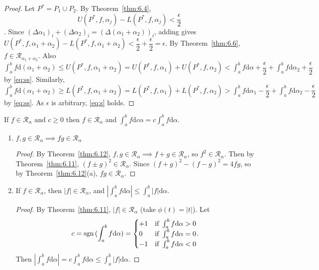 \begin{thm}[12]
\begin{enumerate}
\begin{proof}
			      Let $P^{*}=P_1 \cup P_2$. By Theorem~\ref{thm:6.4},
			      \begin{equation*}
				      U(P^{*},f,\alpha_j)-L(P^{*},f,\alpha_j)<\dfrac{\epsilon}{2} \label{eq:ss}\tag{**}
			      \end{equation*}.
			      Since $(\Delta \alpha_1)_i+(\Delta \alpha_2)_i=(\Delta(\alpha_1+\alpha_2))_i$, adding gives $U(P^{*},f,\alpha_1+\alpha_2)-L(P^{*},f,\alpha_1+\alpha_2)<\dfrac{\epsilon}{2}+\dfrac{\epsilon}{2}=\epsilon$.
			      By Theorem~\ref{thm:6.6}, $f \in \mathscr{R}_{\alpha_1+\alpha_2}$.
			      Also $\int_{a}^{b}{f\mathrm{d}(\alpha_1+\alpha_2)}\le U(P^{*},f,\alpha_1+\alpha_2)=U(P^{*},f,\alpha_1)+U(P^{*},f,\alpha_2)<\int_{a}^{b}{f\mathrm{d}\alpha}+\dfrac{\epsilon}{2}+\int_{a}^{b}{f\mathrm{d}\alpha_2}+\dfrac{\epsilon}{2}$ by \eqref{eq:ss}.
			      Similarly, $\int_{a}^{b}{f\mathrm{d}(\alpha_1+\alpha_2)}\ge L(P^{*},f,\alpha_1+\alpha_2)=L(P^{*},f,\alpha_1)+L(P^{*},f,\alpha_2)>\int_{a}^{b}{f\mathrm{d}\alpha_1}-\dfrac{\epsilon}{2}+\int_{a}^{b}{f\mathrm{d}\alpha_2}-\dfrac{\epsilon}{2}$ by \eqref{eq:ss}. As $\epsilon$ is arbitrary, \eqref{eq:s} holds.
		      \end{proof}
		      If $f \in \mathscr{R}_{\alpha} \text{ and }  c\ge 0$ then $f \in \mathscr{R}_{\alpha}$ and
		      $\int_{a}^{b}{f\mathrm{d}c \alpha}= c \int_{a}^{b}{f\mathrm{d}\alpha}$.
	\end{enumerate}
\end{thm}
\begin{thm}[13]
	\begin{enumerate}
		\item $f,g \in \mathscr{R}_{\alpha}\implies fg \in \mathscr{R}_{\alpha}$
		      \begin{proof}
			      By Theorem~\ref{thm:6.12}, $f,g \in \mathscr{R}_{\alpha}\implies f+g \in \mathscr{R}_{\alpha}$, so $f^2 \in \mathscr{R}_{\alpha}$.
			      Then by Theorem~\ref{thm:6.11}, $(f\pm g)^2 \in \mathscr{R}_{\alpha}$.
			      Since $(f+g)^2-(f-g)^2=4fg$, so by Theorem~\ref{thm:6.12}(a), $fg \in \mathscr{R}_{\alpha}$.
		      \end{proof}
		\item If $f \in \mathscr{R}_{\alpha}$, then $|f| \in \mathscr{R}_{\alpha}$, and $\left|\int_{a}^{b}{f\mathrm{d}\alpha}\right|\le \int_{a}^{b}{|f|\mathrm{d}\alpha}$.
		      \begin{proof}
			      By Theorem~\ref{thm:6.11}, $|f| \in \mathscr{R}_{\alpha}$ (take $\phi(t)=|t|$).
			      Let \[
				      c=\operatorname{sgn}{(\int_{a}^{b}{f\mathrm{d}\alpha})=
				      \begin{cases}
					      +1 & \text{if } \int_{a}^{b}{f\mathrm{d}\alpha}>0 \\
					      0  & \text{if } \int_{a}^{b}{f\mathrm{d}\alpha}=0 \\
					      -1 & \text{if } \int_{a}^{b}{f\mathrm{d}\alpha}<0
				      \end{cases}}
				      .\]
			      Then $\left|   \int_{a}^{b}{f\mathrm{d}\alpha}\right|=c\int_{a}^{b}{f\mathrm{d}\alpha}\le \int_{a}^{b}{|f|\mathrm{d}\alpha}$.
		      \end{proof}
	\end{enumerate}

\end{thm}
